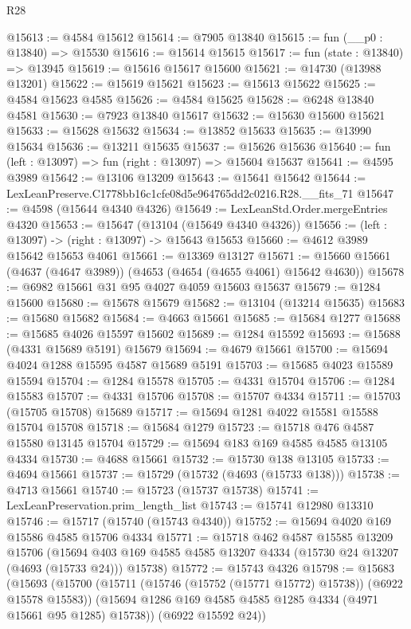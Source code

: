 \begin{lexlean}{R28}
\begin{coremodule}
@15613 := @4584 @15612
@15614 := @7905 @13840
@15615 := fun (__p0 : @13840) => @15530
@15616 := @15614 @15615
@15617 := fun (state : @13840) => @13945
@15619 := @15616 @15617 @15600
@15621 := @14730 (@13988 @13201)
@15622 := @15619 @15621
@15623 := @15613 @15622
@15625 := @4584 @15623 @4585
@15626 := @4584 @15625
@15628 := @6248 @13840 @4581
@15630 := @7923 @13840 @15617
@15632 := @15630 @15600 @15621
@15633 := @15628 @15632
@15634 := @13852 @15633
@15635 := @13990 @15634
@15636 := @13211 @15635
@15637 := @15626 @15636
@15640 := fun (left : @13097) => fun (right : @13097) => @15604 @15637
@15641 := @4595 @3989
@15642 := @13106 @13209
@15643 := @15641 @15642
@15644 := LexLeanPreserve.C1778bb16c1cfe08d5e964765dd2c0216.R28.__fits_71
@15647 := @4598 (@15644 @4340 @4326)
@15649 := LexLeanStd.Order.mergeEntries @4320
@15653 := @15647 (@13104 (@15649 @4340 @4326))
@15656 := (left : @13097) -> (right : @13097) -> @15643 @15653
@15660 := @4612 @3989 @15642 @15653 @4061
@15661 := @13369 @13127
@15671 := @15660 @15661 (@4637 (@4647 @3989)) (@4653 (@4654 (@4655 @4061) @15642 @4630))
@15678 := @6982 @15661 @31 @95 @4027 @4059 @15603 @15637
@15679 := @1284 @15600
@15680 := @15678 @15679
@15682 := @13104 (@13214 @15635)
@15683 := @15680 @15682
@15684 := @4663 @15661
@15685 := @15684 @1277
@15688 := @15685 @4026 @15597 @15602
@15689 := @1284 @15592
@15693 := @15688 (@4331 @15689 @5191) @15679
@15694 := @4679 @15661
@15700 := @15694 @4024 @1288 @15595 @4587 @15689 @5191
@15703 := @15685 @4023 @15589 @15594
@15704 := @1284 @15578
@15705 := @4331 @15704
@15706 := @1284 @15583
@15707 := @4331 @15706
@15708 := @15707 @4334
@15711 := @15703 (@15705 @15708) @15689
@15717 := @15694 @1281 @4022 @15581 @15588 @15704 @15708
@15718 := @15684 @1279
@15723 := @15718 @476 @4587 @15580 @13145 @15704
@15729 := @15694 @183 @169 @4585 @4585 @13105 @4334
@15730 := @4688 @15661
@15732 := @15730 @138 @13105
@15733 := @4694 @15661
@15737 := @15729 (@15732 (@4693 (@15733 @138)))
@15738 := @4713 @15661
@15740 := @15723 (@15737 @15738)
@15741 := LexLeanPreservation.prim_length_list
@15743 := @15741 @12980 @13310
@15746 := @15717 (@15740 (@15743 @4340))
@15752 := @15694 @4020 @169 @15586 @4585 @15706 @4334
@15771 := @15718
    @462
    @4587
    @15585
    @13209
    @15706
    (@15694 @403 @169 @4585 @4585 @13207 @4334 (@15730 @24 @13207 (@4693 (@15733 @24))) @15738)
@15772 := @15743 @4326
@15798 := @15683
    (@15693
      (@15700
        (@15711 (@15746 (@15752 (@15771 @15772) @15738)) (@6922 @15578 @15583))
        (@15694 @1286 @169 @4585 @4585 @1285 @4334 (@4971 @15661 @95 @1285) @15738))
      (@6922 @15592 @24))

\end{coremodule}
\end{lexlean}
